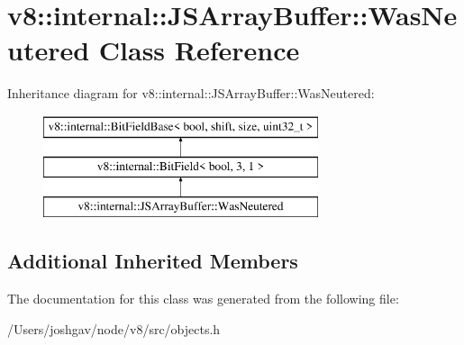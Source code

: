 \hypertarget{classv8_1_1internal_1_1_j_s_array_buffer_1_1_was_neutered}{}\section{v8\+:\+:internal\+:\+:J\+S\+Array\+Buffer\+:\+:Was\+Neutered Class Reference}
\label{classv8_1_1internal_1_1_j_s_array_buffer_1_1_was_neutered}
Inheritance diagram for v8\+:\+:internal\+:\+:J\+S\+Array\+Buffer\+:\+:Was\+Neutered\+:\begin{figure}[H]
\begin{center}
\leavevmode
\includegraphics[height=3.000000cm]{classv8_1_1internal_1_1_j_s_array_buffer_1_1_was_neutered}
\end{center}
\end{figure}
\subsection*{Additional Inherited Members}


The documentation for this class was generated from the following file\+:\begin{DoxyCompactItemize}
\item 
/\+Users/joshgav/node/v8/src/objects.\+h\end{DoxyCompactItemize}
